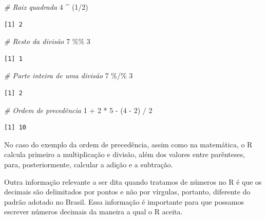 \documentclass[
  brazilian,
]{book}
\newenvironment{Shaded}{\begin{snugshade}}{\end{snugshade}}
\newcommand{\CommentTok}[1]{\textcolor[rgb]{0.56,0.35,0.01}{\textit{#1}}}
\newcommand{\DecValTok}[1]{\textcolor[rgb]{0.00,0.00,0.81}{#1}}
\newcommand{\NormalTok}[1]{#1}
\newcommand{\SpecialCharTok}[1]{\textcolor[rgb]{0.00,0.00,0.00}{#1}}
\begin{document}
\begin{Shaded}
\begin{Highlighting}[]
\CommentTok{\# Raiz quadrada}
\DecValTok{4} \SpecialCharTok{\^{}}\NormalTok{ (}\DecValTok{1}\SpecialCharTok{/}\DecValTok{2}\NormalTok{)}
\end{Highlighting}
\end{Shaded}

\begin{verbatim}
[1] 2
\end{verbatim}

\begin{Shaded}
\begin{Highlighting}[]
\CommentTok{\# Resto da divisão}
\DecValTok{7} \SpecialCharTok{\%\%} \DecValTok{3}
\end{Highlighting}
\end{Shaded}

\begin{verbatim}
[1] 1
\end{verbatim}

\begin{Shaded}
\begin{Highlighting}[]
\CommentTok{\# Parte inteira de uma divisão}
\DecValTok{7} \SpecialCharTok{\%/\%} \DecValTok{3}
\end{Highlighting}
\end{Shaded}

\begin{verbatim}
[1] 2
\end{verbatim}

\begin{Shaded}
\begin{Highlighting}[]
\CommentTok{\# Ordem de precedência}
\DecValTok{1} \SpecialCharTok{+} \DecValTok{2} \SpecialCharTok{*} \DecValTok{5} \SpecialCharTok{{-}}\NormalTok{ (}\DecValTok{4} \SpecialCharTok{{-}} \DecValTok{2}\NormalTok{) }\SpecialCharTok{/} \DecValTok{2}
\end{Highlighting}
\end{Shaded}

\begin{verbatim}
[1] 10
\end{verbatim}

No caso do exemplo da ordem de precedência, assim como na matemática, o R calcula primeiro a multiplicação e divisão, além dos valores entre parênteses, para, posteriormente, calcular a adição e a subtração.

Outra informação relevante a ser dita quando tratamos de números no R é que os decimais são delimitados por pontos e não por vírgulas, portanto, diferente do padrão adotado no Brasil. Essa informação é importante para que possamos escrever números decimais da maneira a qual o R aceita.
\end{document}
